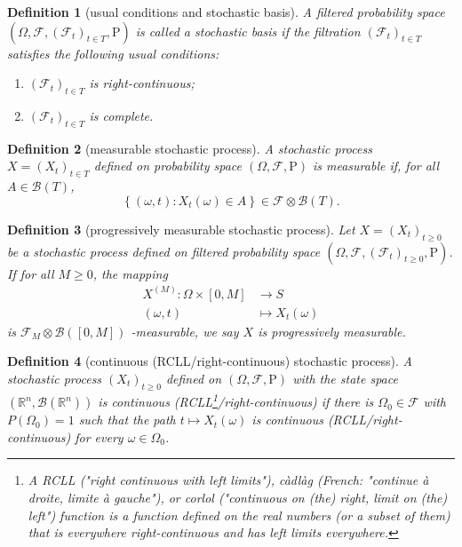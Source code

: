 \documentclass{report}
\newtheorem{definition}{Definition}[section]
\theoremstyle{nonumberplain}
\begin{document}
\begin{definition}[usual conditions and stochastic basis]
	A filtered probability space $(\Omega,\mathcal{F},(\mathcal{F}_{t})_{t\in T },\mathrm{P})$ is called a \emph{stochastic basis} if the filtration $(\mathcal{F}_{t})_{t\in T }$ satisfies the following \emph{usual conditions}:
	\begin{enumerate}
		\item $(\mathcal{F}_{t})_{t\in T }$ is right-continuous;
		\item $(\mathcal{F}_{t})_{t\in T }$ is complete.
	\end{enumerate}
\end{definition}

\begin{definition}[measurable stochastic process]
	A stochastic process $X=(X_t)_{t\in T}$ defined on probability space $(\Omega,\mathcal{F},\mathrm{P})$ is \emph{measurable} if, for all $A \in \mathcal{B}\left(T\right)$,
	\[
	\left\{( \omega,t): X_{t}(\omega) \in A\right\} \in \mathcal{F}\otimes \mathcal{B}(T) .
	\]
\end{definition}

\begin{definition}[progressively measurable stochastic process]
	Let $X=(X_t)_{t\ge0}$ be a stochastic process defined on filtered probability space $(\Omega,\mathcal{F},(\mathcal{F}_{t})_{t\ge0},\mathrm{P})$. If for all $M\ge0$, the mapping
	\begin{align*}
	X^{(M)}: \Omega \times [0, M]&\longrightarrow S\\
	(\omega,t)&\longmapsto X_t(\omega)
	\end{align*}
	is $\mathcal{F}_M\otimes \mathcal{B}([0,M])$ -measurable, we say $X$ is \emph{progressively measurable}.
\end{definition}



\begin{definition}[continuous (RCLL/right-continuous) stochastic process]
	A stochastic process $(X_t)_{t\ge0}$ defined on $(\Omega,\mathcal{F},\mathrm{P})$ with the state space $(\mathbb{R}^n,\mathcal{B}(\mathbb{R}^n))$ is continuous (RCLL\footnote{A RCLL ("right continuous with left limits"), càdlàg (French: "continue à droite, limite à gauche"), or corlol ("continuous on (the) right, limit on (the) left") function is a function defined on the real numbers (or a subset of them) that is everywhere right-continuous and has left limits everywhere.}/right-continuous) if there	is $\Omega_0\in\mathcal{F}$  with $P(\Omega_0) = 1$ such that the path $t\mapsto X_t(\omega)$ is continuous (RCLL/right-continuous) for every $\omega\in\Omega_0$.
\end{definition}
\end{document}
